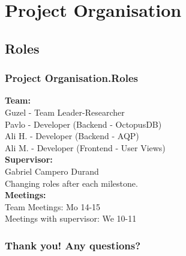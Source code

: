 \documentclass{beamer}
\begin{document}
\section{Project Organisation}

\subsection{Roles}
\begin{frame}
\frametitle{Project Organisation.Roles}
\textbf{Team:} \\
\hspace{0.3 cm}Guzel - Team Leader-Researcher\\
\hspace{0.3 cm}Pavlo - Developer (Backend - OctopusDB)\\
\hspace{0.3 cm}Ali H. - Developer (Backend - AQP)\\
\hspace{0.3 cm}Ali M. - Developer (Frontend - User Views)\\
\vspace{0.2 cm}
\textbf{Supervisor:} \\
\hspace{0.3 cm} Gabriel Campero Durand \\
\vspace{0.2 cm}
Changing roles after each milestone.
\\ \vspace{0.5 cm}
\textbf{Meetings:} \\ 
\hspace{0.5 cm} Team Meetings: Mo 14-15 \\
\hspace{0.5 cm} Meetings with supervisor: We 10-11
\end{frame}

\begin{frame}
 \frametitle{Thank you! Any questions?}
\end{frame}
\end{document}
